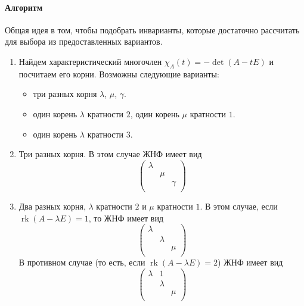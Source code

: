 \documentclass{article}
\newcommand{\rk}{\operatorname{rk}}
\begin{document}
\paragraph{Алгоритм}
Общая идея в том, чтобы подобрать инварианты, которые достаточно рассчитать для выбора из предоставленных вариантов.
\begin{enumerate}
\item Найдем характеристический многочлен $\chi_A(t) = - \det(A - tE)$ и посчитаем его корни. Возможны следующие варианты:
\begin{itemize}
\item три разных корня $\lambda$, $\mu$, $\gamma$.
\item один корень $\lambda$ кратности $2$, один корень $\mu$ кратности $1$.
\item один корень $\lambda$ кратности $3$.
\end{itemize}
\item Три разных корня. В этом случае ЖНФ имеет вид
\[
\begin{pmatrix}
{\lambda}&{}&{}\\
{}&{\mu}&{}\\
{}&{}&{\gamma}\\
\end{pmatrix}
\]

\item Два разных корня, $\lambda$ кратности $2$ и $\mu$ кратности $1$. В этом случае, если $\rk (A - \lambda E) = 1$, то ЖНФ имеет вид
\[
\begin{pmatrix}
{\lambda}&{}&{}\\
{}&{\lambda}&{}\\
{}&{}&{\mu}\\
\end{pmatrix}
\]
В противном случае (то есть, если $\rk(A-\lambda E) = 2$) ЖНФ имеет вид
\[
\begin{pmatrix}
{\lambda}&{1}&{}\\
{}&{\lambda}&{}\\
{}&{}&{\mu}\\
\end{pmatrix}
\]


\end{enumerate}
\end{document}
